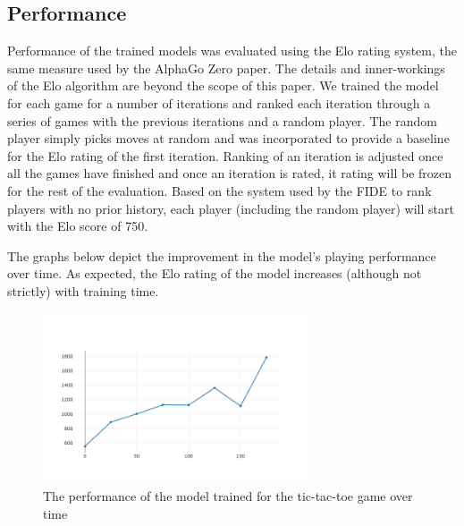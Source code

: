 \documentclass[english]{article}
\begin{document}
\subsection{Performance}

Performance of the trained models was evaluated using the Elo\cite{Elo} rating
system, the same measure used by the AlphaGo Zero paper. The details and
inner-workings of the Elo algorithm are beyond the scope of this paper. We
trained the model for each game for a number of iterations and ranked each
iteration through a series of games with the previous iterations and a random
player. The random player simply picks moves at random and was incorporated to
provide a baseline for the Elo rating of the first iteration. Ranking of an
iteration is adjusted once all the games have finished and once an iteration is
rated, it rating will be frozen for the rest of the evaluation. Based on the
system used by the FIDE \cite{Elo} to rank players with no prior history, each player (including the random player) will start with the Elo score of 750.

The graphs below depict the improvement in the model's playing performance over time. As expected, the Elo rating of the model increases (although not strictly) with training time.

\begin{figure}[h]
\centering
\includegraphics[width=0.7\textwidth]{./images/ttt}
\caption{The performance of the model trained for the tic-tac-toe game over time}
\label{fig:figure_ttt}
\end{figure}
\end{document}
